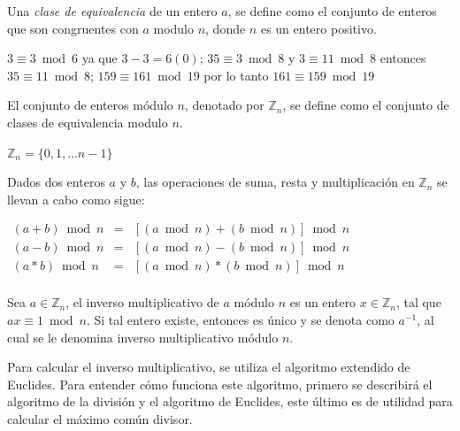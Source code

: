 Una {\it clase de equivalencia} de un entero $a$, se define como el conjunto de enteros que son
congruentes con $a$ modulo $n$, donde $n$ es un entero positivo. 

\begin{example}
  $3 \equiv 3 \bmod 6$ ya que $3-3=6(0)$; 
 $35 \equiv 3 \bmod 8$ y $ 3 \equiv 11 \bmod 8$ entonces $35 \equiv 11 \bmod 8$;
$159 \equiv 161 \bmod 19$ por lo tanto $161 \equiv 159  \bmod 19$ 
\end{example}

\begin{definition}
El conjunto de enteros m\'odulo $n$, denotado por $\mathbb{Z}_n$, se define como el conjunto de 
clases de equivalencia modulo $n$.
\begin{center}
$\mathbb{Z}_n=\{0, 1, \ldots n-1 \}$
\end{center}
\end{definition}

Dados dos enteros $a$ y $b$, las operaciones de suma, resta y multiplicaci\'on en $\mathbb{Z}_n$ se llevan a cabo como sigue:
\begin{center}
$\begin{array}{lcl}
(a+b) \bmod n &=&[(a \bmod n) + (b \bmod n)] \bmod n \\
(a-b) \bmod n &=&[(a \bmod n) - (b \bmod n)] \bmod n \\
(a*b) \bmod n &=&[(a \bmod n) * (b \bmod n)] \bmod n \\
\end{array}
$ 
\end{center}

\begin{definition}
Sea $a \in \mathbb{Z}_n$, el inverso multiplicativo de $a$ m\'odulo $n$ es un entero $x \in \mathbb{Z}_n$,
tal que $ax\equiv 1 \bmod n$. Si tal entero existe, entonces es \'unico y se denota como $a^{-1}$, al cual se 
le denomina inverso multiplicativo m\'odulo $n$. 
\end{definition} 

Para calcular el inverso multiplicativo, se utiliza el algoritmo extendido de Euclides.  Para entender c\'omo funciona
este algoritmo, primero se describir\'a el algoritmo de la divisi\'on y el algoritmo de Euclides, este \'ultimo es 
de utilidad para calcular el m\'aximo com\'un divisor. 

